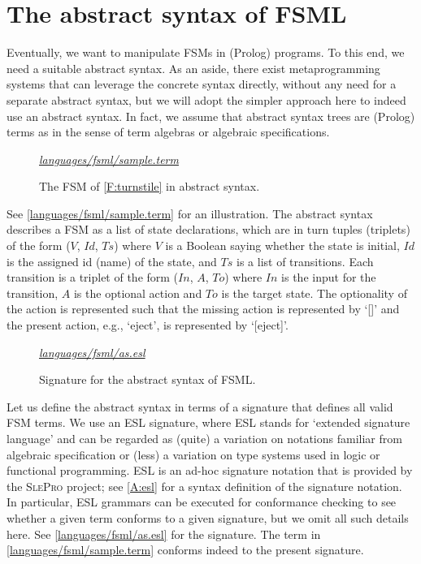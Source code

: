 \documentclass[preprint,authoryear,12pt]{noelsarticle}
\newcommand{\m}[1]{\ensuremath{\mathit{#1}}}
\newcommand{\slepro}{\textsc{SlePro}}
\newcommand{\codefigure}[3]{
\begin{figure}[t!]
\begin{boxedminipage}{\hsize}
\mbox{}\hfill{}{\small\textit{\href{http://github.com/slebok/slepro/tree/master/#2}{#2}}}

\end{boxedminipage}
\caption{#1.}
\label{#2}
\medskip
\end{figure}}
\begin{document}
\section{The abstract syntax of FSML}
\label{S:abstract}

Eventually, we want to manipulate FSMs in (Prolog) programs. To this
end, we need a suitable abstract syntax. As an aside, there exist
metaprogramming systems that can leverage the concrete syntax
directly, without any need for a separate abstract syntax, but we will
adopt the simpler approach here to indeed use an abstract syntax. In
fact, we assume that abstract syntax trees are (Prolog) terms as in
the sense of term algebras or algebraic specifications.

\codefigure{%
The FSM of \autoref{F:turnstile} in abstract syntax}{%
languages/fsml/sample.term}{%
prolog}

See \autoref{languages/fsml/sample.term} for an
illustration. The abstract syntax describes a FSM as a list of state
declarations, which are in turn tuples (triplets) of the form (\m{V},
\m{Id}, \m{Ts}) where \m{V} is a Boolean saying whether the state is
initial, \m{Id} is the assigned id (name) of the state, and \m{Ts} is
a list of transitions. Each transition is a triplet of the form
(\m{In}, \m{A}, \m{To}) where \m{In} is the input for the transition,
\m{A} is the optional action and \m{To} is the target state. The
optionality of the action is represented such that the missing action
is represented by `[]' and the present action, e.g., `eject', is
represented by `[eject]'.

\codefigure{%
Signature for the abstract syntax of FSML}{%
languages/fsml/as.esl}{%
esl}

Let us define the abstract syntax in terms of a signature that defines
all valid FSM terms. We use an ESL signature, where ESL stands for
`extended signature language' and can be regarded as (quite) a
variation on notations familiar from algebraic specification or (less)
a variation on type systems used in logic or functional
programming. ESL is an ad-hoc signature notation that is provided by
the \slepro{} project; see \ref{A:esl} for a syntax definition of
the signature notation. In particular, ESL grammars can be executed
for conformance checking to see whether a given term conforms to a
given signature, but we omit all such details here. See
\autoref{languages/fsml/as.esl} for the signature. The term in
\autoref{languages/fsml/sample.term} conforms indeed to
the present signature.
\end{document}
